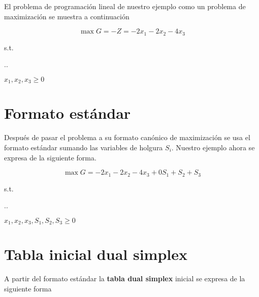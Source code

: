 \documentclass[letter]{article}
\begin{document}
El problema de programación lineal de nuestro ejemplo como un problema de maximización se muestra a continuación

\setcounter{equation}{0}

\begin{equation}
  \label{eq:obj2}
  \max G =  -Z = -2x_1 - 2x_2 - 4x_3
\end{equation}

{\centering
  s.t.

\sysdelim..%
%

\vspace{3mm}
$    x_1, x_2, x_3  \geq 0$ \par}

\section{Formato estándar}
\label{sec:standard}
Después de pasar el problema a su formato canónico de maximización se usa el formato estándar sumando las variables de holgura $S_i$. Nuestro ejemplo ahora se expresa de la siguiente forma.


\setcounter{equation}{0}

\begin{equation}
  \label{eq:obj3}
  \max G = -2x_1 - 2x_2 - 4x_3 + 0S_1  + S_2 + S_3
\end{equation}

{\centering
  s.t.
  \vspace{3mm}
  
\sysdelim..%
%

\vspace{3mm}
$    x_1, x_2, x_3, S_1, S_2, S_3  \geq 0$ \par}

\section*{Tabla inicial dual simplex}
\label{sec:initial-simplex}


A partir del formato estándar la \textbf{tabla dual simplex} inicial se expresa de la siguiente forma
\end{document}
